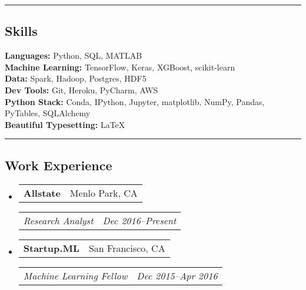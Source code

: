 \documentclass[10pt,letterpaper]{article}
\makeatletter
\newenvironment{indentsection}[1]%
{\begin{list}{}%
	{\setlength{\leftmargin}{#1}}%
	\item[]%
}
{\end{list}}
\newcommand{\headerrow}[2]
{\begin{tabular*}{\linewidth}{l@{\extracolsep{\fill}}r}
	#1 &
	#2 \\
\end{tabular*}}
\makeatother
\begin{document}
\hrule
\subsection*{Skills}
	\begin{indentsection}{\parindent}
		\textbf{Languages:} Python, SQL, MATLAB\\
		\textbf{Machine Learning:} TensorFlow, Keras, XGBoost, scikit-learn\\	
		\textbf{Data:} Spark, Hadoop, Postgres, HDF5 \\
		\textbf{Dev Tools:}  Git, Heroku, PyCharm, AWS \\  
		\textbf{Python Stack:} Conda, IPython, Jupyter, matplotlib, NumPy, Pandas, PyTables, SQLAlchemy \\
		\textbf{Beautiful Typesetting:} \LaTeX
	\end{indentsection}

\hrule
\subsection*{Work Experience}
\begin{itemize}
	\parskip=-0.1em
	\item
	\headerrow
		{\textbf{Allstate}}
		{Menlo Park, CA}
	\headerrow
		{\emph{Research Analyst}}
		{\emph{Dec 2016--Present}}
\end{itemize}

\begin{itemize}
	\parskip=-0.1em
	\item
	\headerrow
		{\textbf{Startup.ML}}
		{San Francisco, CA}
	\headerrow
		{\emph{Machine Learning Fellow}}
		{\emph{Dec 2015--Apr 2016}}
\end{itemize}
\end{document}
